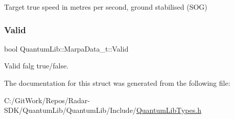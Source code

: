 Target true speed in metres per second, ground stabilised (S\+OG) 

\mbox{\label{struct_quantum_lib_1_1_marpa_data__t_a9a4ca2c1d1339b879ae1e15e4cb29883}} 
\subsubsection{\texorpdfstring{Valid}{Valid}}
{\footnotesize\ttfamily bool Quantum\+Lib\+::\+Marpa\+Data\+\_\+t\+::\+Valid}



Valid falg true/false. 



The documentation for this struct was generated from the following file\+:\begin{DoxyCompactItemize}
\item 
C\+:/\+Git\+Work/\+Repos/\+Radar-\/\+S\+D\+K/\+Quantum\+Lib/\+Quantum\+Lib/\+Include/\mbox{\hyperlink{_quantum_lib_types_8h}{Quantum\+Lib\+Types.\+h}}\end{DoxyCompactItemize}
